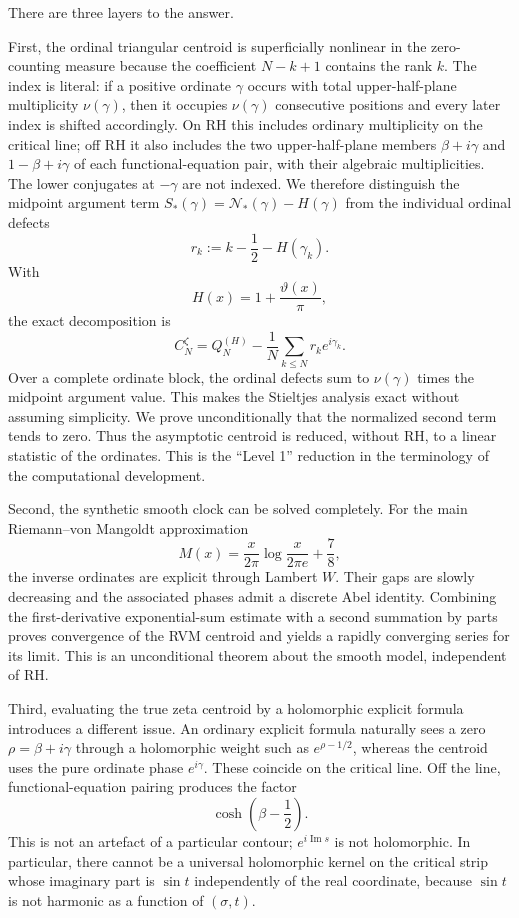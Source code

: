 \documentclass[11pt]{amsart}
\numberwithin{equation}{section}
\theoremstyle{definition}
\theoremstyle{remark}
\begin{document}
There are three layers to the answer.

First, the ordinal triangular centroid is superficially nonlinear in the zero-counting measure because the coefficient $N-k+1$ contains the rank $k$. The index is literal: if a positive ordinate $\gamma$ occurs with total upper-half-plane multiplicity $\nu(\gamma)$, then it occupies $\nu(\gamma)$ consecutive positions and every later index is shifted accordingly. On RH this includes ordinary multiplicity on the critical line; off RH it also includes the two upper-half-plane members $\beta+i\gamma$ and $1-\beta+i\gamma$ of each functional-equation pair, with their algebraic multiplicities. The lower conjugates at $-\gamma$ are not indexed. We therefore distinguish the midpoint argument term $S_*(\gamma)=\mathcal N_*(\gamma)-H(\gamma)$ from the individual ordinal defects
\[
r_k:=k-\frac12-H(\gamma_k).
\]
With
\[
H(x)=1+\frac{\vartheta(x)}{\pi},
\]
the exact decomposition is
\[
C_N^{\zeta}
=Q_N^{(H)}-\frac1N\sum_{k\leq N}r_ke^{i\gamma_k}.
\]
Over a complete ordinate block, the ordinal defects sum to $\nu(\gamma)$ times the midpoint argument value. This makes the Stieltjes analysis exact without assuming simplicity. We prove unconditionally that the normalized second term tends to zero. Thus the asymptotic centroid is reduced, without RH, to a linear statistic of the ordinates. This is the ``Level 1'' reduction in the terminology of the computational development.

Second, the synthetic smooth clock can be solved completely. For the main Riemann--von Mangoldt approximation
\[
M(x)=\frac{x}{2\pi}\log\frac{x}{2\pi e}+\frac78,
\]
the inverse ordinates are explicit through Lambert $W$. Their gaps are slowly decreasing and the associated phases admit a discrete Abel identity. Combining the first-derivative exponential-sum estimate with a second summation by parts proves convergence of the RVM centroid and yields a rapidly converging series for its limit. This is an unconditional theorem about the smooth model, independent of RH.

Third, evaluating the true zeta centroid by a holomorphic explicit formula introduces a different issue. An ordinary explicit formula naturally sees a zero $\rho=\beta+i\gamma$ through a holomorphic weight such as $e^{\rho-1/2}$, whereas the centroid uses the pure ordinate phase $e^{i\gamma}$. These coincide on the critical line. Off the line, functional-equation pairing produces the factor
\[
\cosh\!\left(\beta-\frac12\right).
\]
This is not an artefact of a particular contour; $e^{i\operatorname{Im}s}$ is not holomorphic. In particular, there cannot be a universal holomorphic kernel on the critical strip whose imaginary part is $\sin t$ independently of the real coordinate, because $\sin t$ is not harmonic as a function of $(\sigma,t)$.
\end{document}
